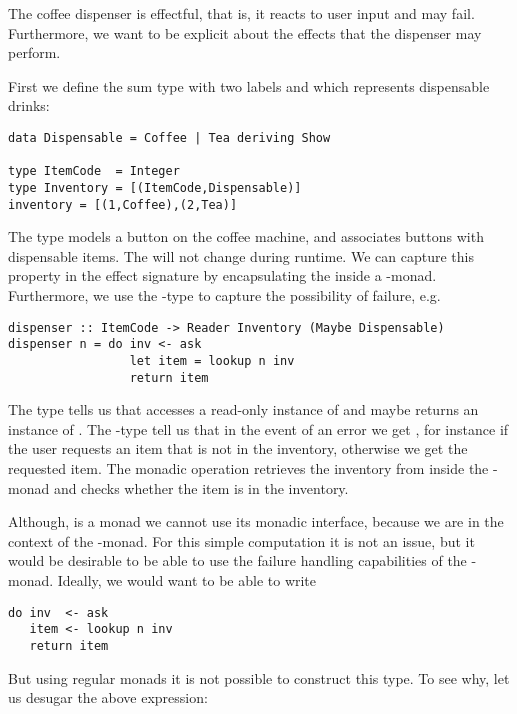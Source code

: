 \begin{example}\label{ex:coffee1}
The coffee dispenser is effectful, that is, it reacts to user input and may fail. Furthermore, we want to be explicit about the effects that the dispenser may perform. 

First we define the sum type  with two labels  and  which represents dispensable drinks:
\begin{lstlisting}[style={haskell}]
data Dispensable = Coffee | Tea deriving Show

type ItemCode  = Integer
type Inventory = [(ItemCode,Dispensable)]
inventory = [(1,Coffee),(2,Tea)]
\end{lstlisting}
The  type models a button on the coffee machine, and  associates buttons with dispensable items. The  will not change during runtime. We can capture this property in the effect signature by encapsulating the  inside a -monad. Furthermore, we use the -type to capture the possibility of failure, e.g.
\begin{lstlisting}[style={haskell}]
dispenser :: ItemCode -> Reader Inventory (Maybe Dispensable)
dispenser n = do inv <- ask
                 let item = lookup n inv
                 return item
\end{lstlisting}
The type  tells us that  accesses a read-only instance of  and maybe returns an instance of . The -type tell us that in the event of an error we get , for instance if the user requests an item that is not in the inventory, otherwise we get  the requested item.
The monadic operation  retrieves the inventory from inside the -monad and  checks whether the item  is in the inventory.  
\end{example}
Although,  is a monad we cannot use its monadic interface, because we are in the context of the -monad. For this simple computation it is not an issue, but it would be desirable to be able to use the failure handling capabilities of the -monad. Ideally, we would want to be able to write
\begin{lstlisting}[style={haskell}]
do inv  <- ask
   item <- lookup n inv
   return item
\end{lstlisting}
But using regular monads it is not possible to construct this type. To see why, let us desugar the above expression:
